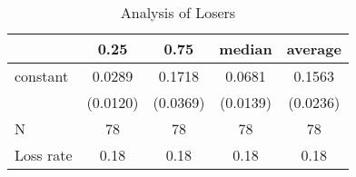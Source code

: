 \begin{table}
\caption{Analysis of Losers}
\begin{center}
\begin{tabular}{lcccc}
\hline
          &   0.25   &   0.75   &  median  & average   \\
\midrule
\midrule
constant  & 0.0289   & 0.1718   & 0.0681   & 0.1563    \\
          & (0.0120) & (0.0369) & (0.0139) & (0.0236)  \\
N         & 78       & 78       & 78       & 78        \\
Loss rate & 0.18     & 0.18     & 0.18     & 0.18      \\
\hline
\end{tabular}
\end{center}
\end{table}